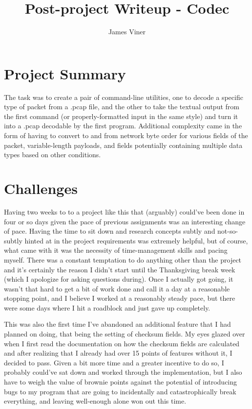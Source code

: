 \documentclass[11pt]{report}
\begin{document}
\title{Post-project Writeup - Codec}
\author{James Viner}
\date{} %

\maketitle

\doublespacing

\section*{Project Summary}
The task was to create a pair of command-line utilities, one to decode a specific type of packet from a .pcap file, and the other to take the textual output from the first command (or properly-formatted input in the same style) and turn it into a .pcap decodable by the first program. Additional complexity came in the form of having to convert to and from network byte order for various fields of the packet, variable-length payloads, and fields potentially containing multiple data types based on other conditions.
\section*{Challenges}
Having two weeks to to a project like this that (arguably) could've been done in four or so days given the pace of previous assignments was an interesting change of pace. Having the time to sit down and research concepts subtly and not-so-subtly hinted at in the project requirements was extremely helpful, but of course, what came with it was the necessity of time-management skills and pacing myself. There was a constant temptation to do anything other than the project and it's certainly the reason I didn't start until the Thanksgiving break week (which I apologize for asking questions during). Once I actually got going, it wasn't that hard to get a bit of work done and call it a day at a reasonable stopping point, and I believe I worked at a reasonably steady pace, but there were some days where I hit a roadblock and just gave up completely.

This was also the first time I've abandoned an additional feature that I had planned on doing, that being the setting of checksum fields. My eyes glazed over when I first read the documentation on how the checksum fields are calculated and after realizing that I already had over 15 points of features without it, I decided to pass. Given a bit more time and a greater incentive to do so, I probably could've sat down and worked through the implementation, but I also have to weigh the value of brownie points against the potential of introducing bugs to my program that are going to incidentally and catastrophically break everything, and leaving well-enough alone won out this time.
\end{document}
